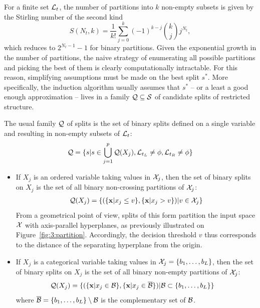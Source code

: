 For a finite set ${\cal L}_t$, the number of partitions into $k$
non-empty subsets is given by the Stirling number of the second
kind~\citep{knuth:1992}
\begin{equation}
S(N_t, k) = \frac{1}{k!} \sum_{j=0}^k (-1)^{k-j} {k\choose j} j^{N_t},
\end{equation}
which reduces to $2^{N_t-1}-1$ for binary partitions. Given the exponential
growth in the number of partitions, the naive strategy of enumerating all
possible partitions and picking the best of them is clearly computationally
intractable. For this reason, simplifying  assumptions must be made on the best
split $s^*$. More specifically, the induction algorithm usually assumes that
$s^*$ -- or a least a good enough approximation -- lives in a family ${\cal Q}
\subseteq {\cal S}$ of candidate splits of restricted structure.

The usual family ${\cal Q}$ of
splits is the set of binary splits defined on a single variable and resulting
in non-empty subsets of ${\cal L}_t$:
\begin{equation}\label{eqn:q:single-variables}
{\cal Q} = \{s | s \in \bigcup_{j=1}^p {\cal Q}(X_j), {\cal L}_{t_L} \neq \phi, {\cal L}_{t_R} \neq \phi \}
\end{equation}
\begin{itemize}
\item If $X_j$ is an ordered variable taking values in ${\cal X}_j$, then the set of binary splits on $X_j$ is the set
of all binary non-crossing partitions of ${\cal X}_j$:
\begin{align}
{\cal Q}(X_j) = \{ (\{ \mathbf{x} | x_j \leq v \}, \{ \mathbf{x} | x_j > v \}) | v \in {\cal X}_j \} \label{eqn:q:ordered}
\end{align}
From a geometrical point of view, splits of this form partition the input space
${\cal X}$ with axis-parallel hyperplanes, as previously illustrated on
Figure~\ref{fig:3:partition}. Accordingly, the decision threshold $v$ thus
corresponds to the distance of the separating hyperplane from the origin.
\item If $X_j$ is a categorical variable taking values in ${\cal X}_j = \{ b_1, \dots, b_L \}$, then the set of binary splits on
$X_j$ is the set of all binary  non-empty partitions of ${\cal X}_j$:
\begin{align}\label{eqn:q:categorical-cart}
{\cal Q}(X_j) = \{ (\{\mathbf{x} | x_j \in {\cal B} \}, \{\mathbf{x} | x_j \in \overline{\cal B}\}) | &{\cal B} \subset \{ b_1, \dots, b_L \} \}
\end{align}
where $\overline{\cal B} = \{ b_1, \dots, b_L \} \setminus {\cal B}$ is the complementary set of ${\cal B}$.
\end{itemize}

